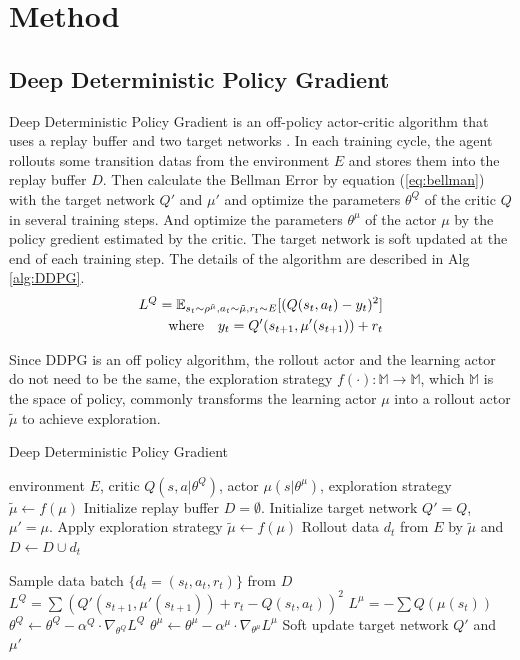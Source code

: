 \section{Method}
\subsection{Deep Deterministic Policy Gradient}
Deep Deterministic Policy Gradient is an off-policy actor-critic algorithm that uses a replay buffer and two target networks \cite{DDPG}. In each training cycle, the agent rollouts some  transition datas from the environment $E$ and stores them into the replay buffer $D$. Then calculate the Bellman Error by equation (\ref{eq:bellman}) with the target network $Q'$ and $\mu'$ and optimize the parameters $\theta^{Q}$ of the critic $Q$ in several training steps. And optimize the parameters $\theta^{\mu}$ of the actor $\mu$ by the policy gredient estimated by the critic. The target network is soft updated at the end of each training step. The details of the algorithm are described in Alg \ref{alg:DDPG}.
\begin{equation}
   \label{eq:bellman} 
   \begin{aligned}
   L^Q=\mathbb{E}_{s_t\sim\rho^{\tilde\mu},a_t\sim\tilde\mu,r_t\sim E}[(Q(s_t,a_t)-y_t)^2]\\
   \text{where\quad}  y_t = Q'(s_{t+1},\mu'(s_{t+1}))+r_t
   \end{aligned}
\end{equation}

Since DDPG is an off policy algorithm, the rollout actor and the learning actor do not need to be the same, the exploration strategy $f(\cdot) : \mathbb{M} \rightarrow \mathbb{M}$, which $\mathbb{M}$ is the space of policy, commonly transforms the learning actor $\mu$ into a rollout actor $\tilde\mu$ to achieve exploration.

\begin{algorithm}[htbp]
   \caption{Deep Deterministic Policy Gradient}
   \label{alg:DDPG}
\begin{algorithmic}
    environment $E$, critic $Q(s,a|\theta^Q)$, actor $\mu(s|\theta^\mu)$, exploration strategy $\tilde\mu \leftarrow f(\mu)$
   \STATE Initialize replay buffer $D = \emptyset$.
   \STATE Initialize target network $Q'= Q$, $\mu'= \mu$.
   \STATE Apply exploration strategy $\tilde\mu \leftarrow f(\mu)$
   \STATE Rollout data $d_t$ from $E$ by $\tilde\mu$ and $D \leftarrow D\cup {d_t}$

   \STATE Sample data batch $\{d_t=(s_t,a_t,r_t)\}$ from $D$
   \STATE $L^Q=\sum(Q'(s_{t+1},\mu'(s_{t+1}))+r_t-Q(s_t,a_t))^2$
   \STATE $L^\mu=-\sum Q(\mu(s_t))$
   \STATE $\theta^Q \leftarrow \theta^Q - \alpha^Q\cdot\nabla_{\theta^Q} L^Q$
   \STATE $\theta^\mu \leftarrow \theta^\mu -\alpha^\mu\cdot\nabla_{\theta^\mu} L^\mu$
   \STATE Soft update target network $Q'$ and $\mu'$
   \ENDFOR
   \ENDFOR
\end{algorithmic}
\end{algorithm}


